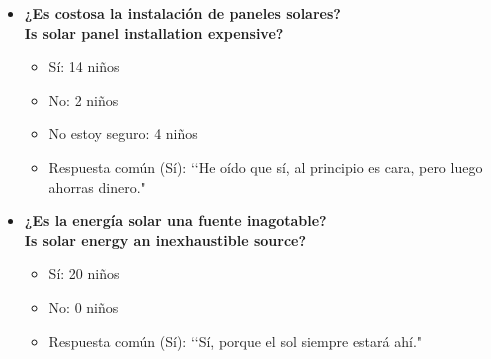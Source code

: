 \documentclass[12pt]{article}
\begin{document}
\begin{itemize}
      \item \textbf{¿Es costosa la instalación de paneles solares?}\\
            \textbf{Is solar panel installation expensive?}
            \begin{itemize}
                  \item Sí: 14 niños
                  \item No: 2 niños
                  \item No estoy seguro: 4 niños
                  \item Respuesta común (Sí): \lq\lq He oído que sí, al principio es cara, pero luego ahorras dinero."
            \end{itemize}
            \begin{minipage}{\linewidth}
                  \centering
                  \begin{minipage}{0.5\linewidth}
                  \end{minipage}%
            \end{minipage}

      \item \textbf{¿Es la energía solar una fuente inagotable?}\\
            \textbf{Is solar energy an inexhaustible source?}
            \begin{itemize}
                  \item Sí: 20 niños
                  \item No: 0 niños
                  \item Respuesta común (Sí): \lq\lq Sí, porque el sol siempre estará ahí."
            \end{itemize}
            \begin{minipage}{\linewidth}
                  \centering
                  \begin{minipage}{0.5\linewidth}
                  \end{minipage}%
            \end{minipage}
\end{itemize}
\end{document}
